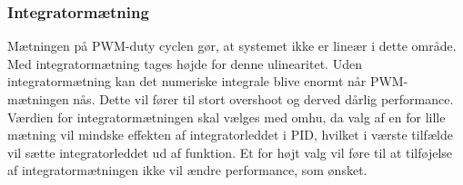 \subsubsection{Integratormætning}
Mætningen på PWM-duty cyclen gør, at systemet ikke er lineær i dette område. Med integratormætning 
tages højde for denne ulinearitet. Uden integratormætning kan det numeriske integrale blive enormt når 
PWM-mætningen nås. Dette vil fører til stort overshoot og derved dårlig 
performance. 
Værdien for integratormætningen skal vælges med omhu, da valg af en for lille 
mætning vil mindske effekten af integratorleddet i PID, 
hvilket i værste tilfælde vil sætte integratorleddet ud af funktion.
Et for højt valg vil føre til at tilføjelse af integratormætningen ikke vil ændre 
performance, som ønsket.



